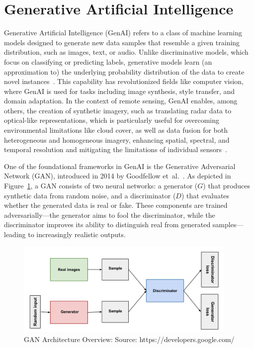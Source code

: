 \section{Generative Artificial Intelligence}
\label{sec:genAI}
Generative Artificial Intelligence (GenAI) refers to a class of machine learning models designed to generate new data samples that resemble a given training distribution, such as images, text, or audio. Unlike discriminative models, which focus on classifying or predicting labels, generative models learn (an approximation to) the underlying probability distribution of the data to create novel instances~\cite{genAI_HS_sens_data_review}. This capability has revolutionized fields like computer vision, where GenAI is used for tasks including image synthesis, style transfer, and domain adaptation. In the context of remote sensing, GenAI enables, among others, the creation of synthetic imagery, such as translating radar data to optical-like representations, which is particularly useful for overcoming environmental limitations like cloud cover, as well as data fusion for both heterogeneous and homogeneous imagery, enhancing spatial, spectral, and temporal resolution and mitigating the limitations of individual sensors~\cite{RS_Data_Fusion_GANs_sota}.

One of the foundational frameworks in GenAI is the Generative Adversarial Network (GAN), introduced in 2014 by Goodfellow et~al.~\cite{GANs_Goodfellow}. As depicted in Figure~\ref{fig:GANs}, a GAN consists of two neural networks: a generator ($G$) that produces synthetic data from random noise, and a discriminator ($D$) that evaluates whether the generated data is real or fake. 
These components are trained adversarially—the generator aims to fool the discriminator, while the discriminator improves its ability to distinguish real from generated samples—leading to increasingly realistic outputs.
\begin{figure}[!htbp]
  \centering
  \includegraphics[width=0.95\textwidth]{img/GANs.png}
  \caption[GAN architecture overview]{GAN Architecture Overview: Source: https://developers.google.com/}
  \label{fig:GANs}
\end{figure}

